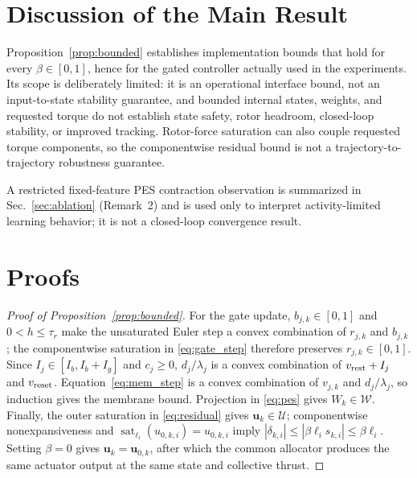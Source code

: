 \documentclass[letterpaper, 10 pt, conference]{ieeeconf}
\newcommand{\sat}{\operatorname{sat}}
\begin{document}
\section{Discussion of the Main Result}
\label{sec:discussion}
Proposition~\ref{prop:bounded} establishes implementation bounds that hold for every $\beta\in[0,1]$, hence for the gated controller actually used in the experiments. Its scope is deliberately limited: it is an operational interface bound, not an input-to-state stability guarantee, and bounded internal states, weights, and requested torque do not establish state safety, rotor headroom, closed-loop stability, or improved tracking. Rotor-force saturation can also couple requested torque components, so the componentwise residual bound is not a trajectory-to-trajectory robustness guarantee.

A restricted fixed-feature PES contraction observation is summarized in Sec.~\ref{sec:ablation} (Remark~2) and is used only to interpret activity-limited learning behavior; it is not a closed-loop convergence result.

\section{Proofs}
\label{sec:proofs}
\begin{proof}[Proof of Proposition~\ref{prop:bounded}]
For the gate update, $b_{j,k}\in[0,1]$ and $0<h\le\tau_r$ make the unsaturated Euler step a convex combination of $r_{j,k}$ and $b_{j,k}$; the componentwise saturation in \eqref{eq:gate_step} therefore preserves $r_{j,k}\in[0,1]$. Since $I_j\in[I_b,I_b+I_g]$ and $c_j\ge0$, $d_j/\lambda_j$ is a convex combination of $v_{\rm rest}+I_j$ and $v_{\rm reset}$. Equation~\eqref{eq:mem_step} is a convex combination of $v_{j,k}$ and $d_j/\lambda_j$, so induction gives the membrane bound. Projection in \eqref{eq:pes} gives $W_k\in\mathcal W$. Finally, the outer saturation in \eqref{eq:residual} gives $\bm u_k\in\mathcal U$; componentwise nonexpansiveness and $\sat_{\ell_i}(u_{0,k,i})=u_{0,k,i}$ imply $|\delta_{k,i}|\le|\beta\ell_i s_{k,i}|\le\beta\ell_i$. Setting $\beta=0$ gives $\bm u_k=\bm u_{0,k}$, after which the common allocator produces the same actuator output at the same state and collective thrust.
\end{proof}
\end{document}
